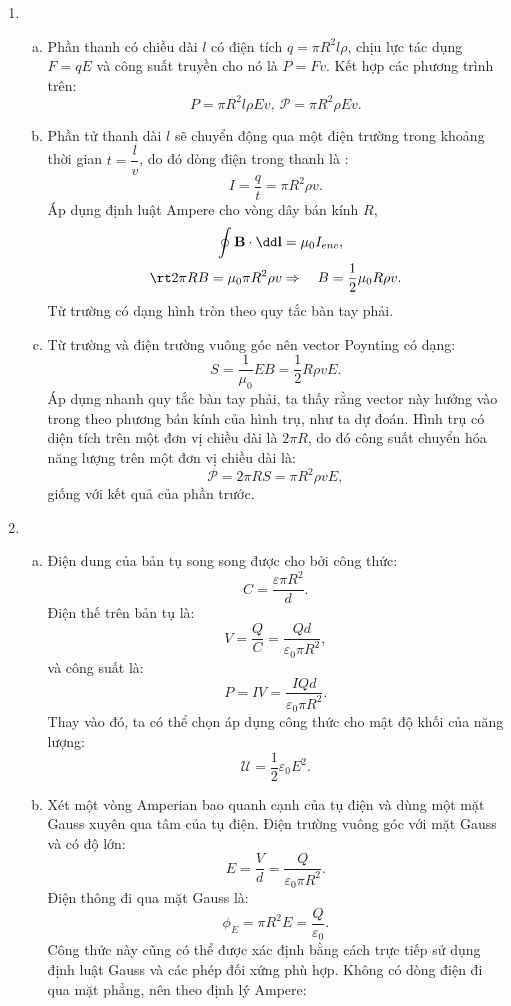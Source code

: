 \begin{loigiai}
\begin{enumerate}[1)]
    \item
    \begin{enumerate}[a)]
        \item Phần thanh có chiều dài $l$ có điện tích $q=\pi R^2 l \rho$, chịu lực tác dụng $F=qE$ và công suất truyền cho nó là $P=Fv$. Kết hợp các phương trình trên:
        $$ P=\pi R^2 l\rho Ev, \ \mathcal{P}=\pi R^2\rho Ev.$$
        \item Phần tử thanh dài $l$ sẽ chuyển động qua một điện trường trong khoảng thời gian $t=\dfrac{l}{v}$, do đó dòng điện trong thanh là :
        $$I=\dfrac{q}{t}=\pi R^2 \rho v.$$
        Áp dụng định luật Ampere cho vòng dây bán kính $R$,
        $$
\begin{aligned}
\oint \mathbf{B} \cdot \dd \mathbf{l} &=\mu_{0} I_{e n c}, \\
\rt 2 \pi R B=\mu_{0} \pi R^{2} \rho v & \Rightarrow \quad B=\frac{1}{2} \mu_{0} R \rho v.
\end{aligned}
$$
Từ trường có dạng hình tròn theo quy tắc bàn tay phải.
\item Từ trường và điện trường vuông góc nên vector Poynting có dạng:
$$S=\dfrac{1}{\mu_0}EB=\dfrac{1}{2}R\rho v E.$$
Áp dụng nhanh quy tắc bàn tay phải, ta thấy rằng vector này hướng vào trong theo phương bán kính của hình trụ, như ta dự đoán. Hình trụ có diện tích trên một đơn vị chiều dài là $2\pi R$, do đó công suất chuyển hóa năng lượng trên một đơn vị chiều dài là:
$$\mathcal{P}=2\pi R S=\pi R^2 \rho vE,$$
giống với kết quả của phần trước.
\end{enumerate}
\item \begin{enumerate}[a)]
    \item Điện dung của bản tụ song song được cho bởi công thức:
    $$C=\dfrac{\varepsilon \pi R^2}{d}.$$
    Điện thế trên bản tụ là:
    $$V=\dfrac{Q}{C}=\dfrac{Qd}{\varepsilon_0\pi R^2},$$
    và công suất là:
    $$P=IV=\dfrac{IQd}{\varepsilon_0\pi R^2}.$$
    Thay vào đó, ta có thể chọn áp dụng công thức cho mật độ khối của năng lượng:
    $$\mathcal{U}=\dfrac{1}{2}\varepsilon_0E^2.$$
    \item Xét một vòng Amperian bao quanh cạnh của tụ điện và dùng một mặt Gauss xuyên qua tâm của tụ điện. Điện trường vuông góc với mặt Gauss và có độ lớn:
    $$E=\dfrac{V}{d}=\dfrac{Q}{\varepsilon_0\pi R^2}.$$
    Điện thông đi qua mặt Gauss là:
    $$\phi_E = \pi R^2 E=\dfrac{Q}{\varepsilon_0}.$$
    Công thức này cũng có thể được xác định bằng cách trực tiếp sử dụng định luật Gauss và các phép đối xứng phù hợp. Không có dòng điện đi qua mặt phẳng, nên theo định lý Ampere:

\end{enumerate}
\end{enumerate}
\end{loigiai}
